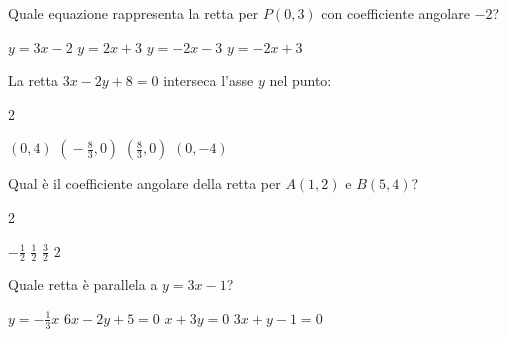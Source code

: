 \documentclass[a4paper,10pt]{exam}
\begin{document}
\begin{questions}
\question Quale equazione rappresenta la retta per $P(0,3)$ con coefficiente angolare $-2$?
\vspace{0.2em}
\begin{choices}
\choice $y=3x-2$
\choice $y=2x+3$
\choice $y=-2x-3$
\choice $y=-2x+3$
\end{choices}

\question La retta $3x-2y+8=0$ interseca l'asse $y$ nel punto:
\vspace{0.2em}
\begin{multicols}{2}
\begin{choices}
\choice $(0,4)$
\choice $(\!-\frac83,0)$
\choice $(\frac83,0)$
\choice $(0,-4)$
\end{choices}
\end{multicols}

\question Qual è il coefficiente angolare della retta per $A(1,2)$ e $B(5,4)$?
\vspace{0.2em}
\begin{multicols}{2}
\begin{choices}
\choice $-\frac12$
\choice $\frac12$
\choice $\frac32$
\choice $2$
\end{choices}
\end{multicols}

\question Quale retta è parallela a $y=3x-1$?
\vspace{0.2em}
\begin{choices}
\choice $y=-\frac13x$
\choice $6x-2y+5=0$
\choice $x+3y=0$
\choice $3x+y-1=0$
\end{choices}

\end{questions}
\end{document}

